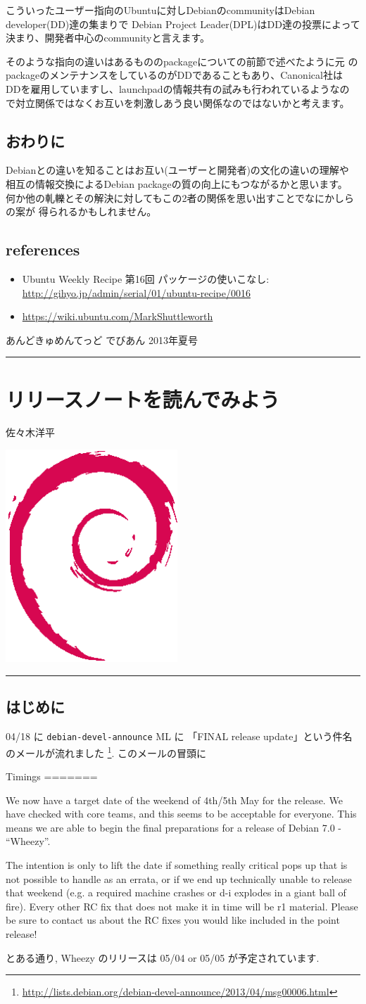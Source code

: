 \documentclass[mingoth,a4paper]{jsarticle}
\renewcommand{\dancersection}[2]{%
\newpage
あんどきゅめんてっど でびあん 2013年夏号
%
\vspace{0.1mm}\\
{\color{dancerdarkblue}\rule{\hsize}{2mm}}

%
%
\begin{minipage}[t]{0.6\hsize}
\color{dancerdarkblue}
\vspace{1cm}
\section{#1}
\hfill{}#2\\
\end{minipage}
\begin{minipage}[t]{0.4\hsize}
\vspace{-2cm}
\hfill{}\includegraphics[height=8cm]{image200502/openlogo-nd.eps}\\
\vspace{-5cm}
\end{minipage}
%
{\color{dancerlightblue}\rule{0.66\hsize}{2mm}}
%
\vspace{2cm}
}
\begin{document}
こういったユーザー指向のUbuntuに対しDebianのcommunityはDebian
developer(DD)達の集まりで Debian Project
Leader(DPL)はDD達の投票によって決まり、開発者中心のcommunityと言えます。

そのような指向の違いはあるもののpackageについての前節で述べたように元
のpackageのメンテナンスをしているのがDDであることもあり、Canonical社は
DDを雇用していますし、launchpadの情報共有の試みも行われているようなの
で対立関係ではなくお互いを刺激しあう良い関係なのではないかと考えます。

\subsection{おわりに}

Debianとの違いを知ることはお互い(ユーザーと開発者)の文化の違いの理解や
相互の情報交換によるDebian packageの質の向上にもつながるかと思います。
何か他の軋轢とその解決に対してもこの2者の関係を思い出すことでなにかしらの案が
得られるかもしれません。

\subsection{references}

\begin{itemize}
\itemsep1pt\parskip0pt
\item
  Ubuntu Weekly Recipe 第16回 パッケージの使いこなし:
  \url{http://gihyo.jp/admin/serial/01/ubuntu-recipe/0016}
\item
  \url{https://wiki.ubuntu.com/MarkShuttleworth}
\end{itemize}

\dancersection{リリースノートを読んでみよう}{ 佐々木洋平}

\subsection{はじめに}

04/18 に \texttt{debian-devel-announce} ML に
「FINAL release update」という件名のメールが流れました
\footnote{\url{http://lists.debian.org/debian-devel-announce/2013/04/msg00006.html}}.
このメールの冒頭に
\begin{commandline}
Timings
=======

We now have a target date of the weekend of 4th/5th May for the release.
We have checked with core teams, and this seems to be acceptable for
everyone. This means we are able to begin the final preparations for a
release of Debian 7.0 - ``Wheezy''.

The intention is only to lift the date if something really critical pops
up that is not possible to handle as an errata, or if we end up
technically unable to release that weekend (e.g. a required machine
crashes or d-i explodes in a giant ball of fire). Every other RC fix
that does not make it in time will be r1 material. Please be sure to
contact us about the RC fixes you would like included in the point
release!
\end{commandline}
\noindent
とある通り, Wheezy のリリースは 05/04 or 05/05 が予定されています.
\end{document}
